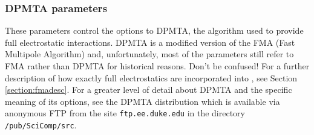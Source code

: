 \subsubsection{DPMTA parameters}

These parameters control the options to DPMTA, the algorithm
used to provide full electrostatic interactions.  DPMTA is a
modified version of the FMA (Fast Multipole Algorithm) and, 
unfortunately, most of the parameters still refer to FMA
rather than DPMTA for historical reasons.  Don't be confused!
\prettypar
For a further description of how exactly full electrostatics
are incorporated into \NAMD, see Section \ref{section:fmadesc}.
For a greater level of detail about DPMTA and the specific
meaning of its options, see the DPMTA distribution which is
available via anonymous FTP from the site \verb!ftp.ee.duke.edu!
in the directory \verb!/pub/SciComp/src!.

